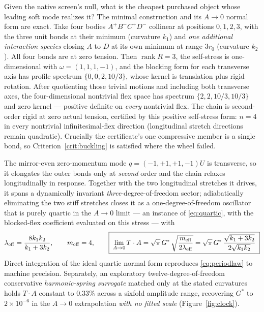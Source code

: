 \documentclass[11pt,a4paper]{article}
\newcommand{\Gstar}{{G^{*}}}
\theoremstyle{definition}
\theoremstyle{plain}
\theoremstyle{remark}
\begin{document}
Given the native screen's null, what is the cheapest purchased object whose
leading soft mode realizes it? The minimal construction and its
$A\to0$ normal form are exact. Take four bodies $A^+B^-C^+D^-$
collinear at positions $0,1,2,3$, with the three unit bonds at their
minimum (curvature $k_1$) and \emph{one additional interaction species}
closing $A$ to $D$ at its own minimum at range $3r_0$ (curvature $k_2$).
All four bonds are at zero tension. Then $\operatorname{rank}R = 3$, the
self-stress is one-dimensional with $\omega=(1,1,1,-1)$, and the blocking
form for each transverse axis has profile spectrum
$\{0,0,2,10/3\}$, whose kernel is translation plus rigid rotation. After
quotienting those trivial motions and including both transverse axes, the
four-dimensional nontrivial flex space has spectrum
$\{2,2,10/3,10/3\}$ and zero kernel --- positive definite on
\emph{every} nontrivial flex. The chain is second-order rigid at zero
actual tension, certified by this positive self-stress form: $n=4$ in
every nontrivial infinitesimal-flex direction (longitudinal stretch
directions remain quadratic). Crucially the certificate's one compressive
member is a single bond, so Criterion~\ref{crit:buckling} is satisfied where the wheel
failed.

The mirror-even zero-momentum mode $q = (-1,+1,+1,-1)U$ is transverse, so
it elongates the outer bonds only at \emph{second} order and the chain
relaxes longitudinally in response. Together with the two longitudinal
stretches it drives, it spans a dynamically invariant
\emph{three}-degree-of-freedom sector; adiabatically eliminating the two
stiff stretches closes it as a one-degree-of-freedom oscillator that is
purely quartic in the $A\to0$ limit --- an instance of
\eqref{eq:quartic}, with the blocked-flex coefficient evaluated on this
stress --- with
\begin{equation}
\lambda_{\rm eff} = \frac{8k_1k_2}{k_1+3k_2}, \qquad m_{\rm eff} = 4,
\qquad
\boxed{\;\lim_{A\to0}T\cdot A = \sqrt{\pi}\,\Gstar\,
\sqrt{\frac{m_{\rm eff}}{2\lambda_{\rm eff}}}
= \sqrt{\pi}\,\Gstar\,\frac{\sqrt{k_1+3k_2}}{2\sqrt{k_1k_2}}\;}
\label{eq:periodlaw}
\end{equation}
Direct integration of the ideal quartic normal form reproduces
\eqref{eq:periodlaw} to machine precision. Separately, an exploratory
twelve-degree-of-freedom conservative \emph{harmonic-spring surrogate}
matched only at the stated curvatures holds $T\cdot A$ constant to $0.33\%$
across a sixfold amplitude range, recovering $\Gstar$ to $2\times10^{-6}$
in the $A\to0$ extrapolation \emph{with no fitted scale}
(Figure~\ref{fig:clock}).
\end{document}
